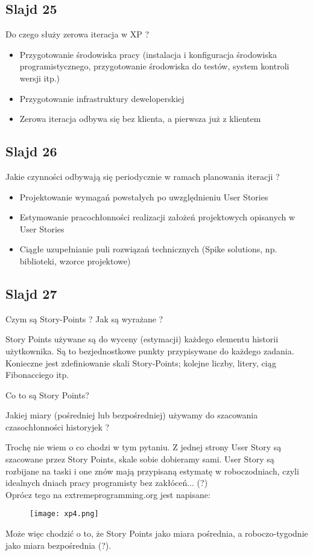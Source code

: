 \documentclass[a4paper,15pt]{article}
\newcommand{\question}[2]{
    \begin{tcolorbox}[colback=mRed!5!white,colframe=mRed,title={Kolokwium 2018 #1}]
        #2
    \end{tcolorbox}
}
\begin{document}
\subsection{Slajd 25}
\begin{framed}
Do czego służy zerowa iteracja w XP ?
\end{framed}
\begin{itemize}
\item Przygotowanie środowiska pracy (instalacja i konfiguracja środowiska programistycznego, przygotowanie środowiska do testów, system kontroli wersji itp.)
\item Przygotowanie infrastruktury deweloperskiej
\item Zerowa iteracja odbywa się bez klienta, a pierwsza już z klientem
\end{itemize}

\subsection{Slajd 26}
\begin{framed}
Jakie czynności odbywają się periodycznie w ramach planowania iteracji ?
\end{framed}
\begin{itemize}
\item Projektowanie wymagań powstałych po uwzględnieniu User Stories
\item Estymowanie pracochłonności realizacji założeń projektowych opisanych w User Stories
\item Ciągłe uzupełnianie puli rozwiązań technicznych (Spike solutions, np. biblioteki, wzorce projektowe)
\end{itemize}

\subsection{Slajd 27}
\begin{framed}
Czym są Story-Points ? Jak są wyrażane ?
\end{framed}
Story Points używane są do wyceny (estymacji) każdego elementu historii użytkownika. Są to bezjednostkowe punkty przypisywane do każdego zadania. Konieczne jest zdefiniowanie skali Story-Points; kolejne liczby, litery, ciąg Fibonacciego itp.

\question{}{
Co to są Story Points? 
}

\question{}{
 Jakiej miary (pośredniej lub bezpośredniej) używamy do szacowania czasochłonności historyjek ?
}
Trochę nie wiem o co chodzi w tym pytaniu. Z jednej strony User Story są szacowane przez Story Points, skale sobie dobieramy sami. User Story są rozbijane na taski i one znów mają przypisaną estymatę w roboczodniach, czyli idealnych dniach pracy programisty bez zakłóceń... (?)  \\
Oprócz tego na extremeprogramming.org jest napisane:
\begin{figure}[H]
\centerline{\texttt{[image: xp4.png]}}
\end{figure}
Może więc chodzić o to, że Story Points jako miara pośrednia, a roboczo-tygodnie jako miara bezpośrednia (?).
\end{document}
